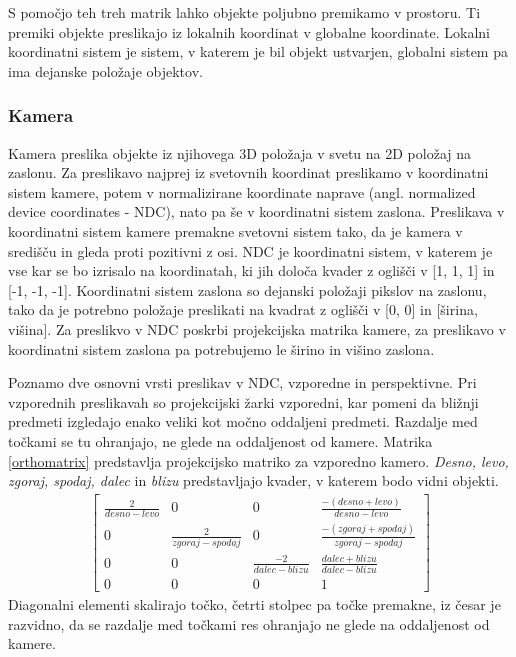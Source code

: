 \documentclass[a4paper, 12pt]{book}
\begin{document}
S pomočjo teh treh matrik lahko objekte poljubno premikamo v prostoru. Ti premiki objekte preslikajo iz lokalnih koordinat v globalne koordinate. Lokalni koordinatni sistem je sistem, v katerem je bil objekt ustvarjen, globalni sistem pa ima dejanske položaje objektov.

\subsubsection*{Kamera}

Kamera preslika objekte iz njihovega 3D položaja v svetu na 2D položaj na zaslonu. Za preslikavo najprej iz svetovnih koordinat preslikamo v koordinatni sistem kamere, potem v normalizirane koordinate naprave (angl. normalized device coordinates - NDC), nato pa še v koordinatni sistem zaslona. Preslikava v koordinatni sistem kamere premakne svetovni sistem tako, da je kamera v središču in gleda proti pozitivni z osi. NDC je koordinatni sistem, v katerem je vse kar se bo izrisalo na koordinatah, ki jih določa kvader z oglišči v [1, 1, 1] in [-1, -1, -1]. Koordinatni sistem zaslona so dejanski položaji pikslov na zaslonu, tako da je potrebno položaje preslikati na kvadrat z oglišči v [0, 0] in [širina, višina]. Za preslikvo v NDC poskrbi projekcijska matrika kamere, za preslikavo v koordinatni sistem zaslona pa potrebujemo le širino in višino zaslona.

Poznamo dve osnovni vrsti preslikav v NDC, vzporedne in perspektivne. Pri vzporednih preslikavah so projekcijski žarki vzporedni, kar pomeni da bližnji predmeti izgledajo enako veliki kot močno oddaljeni predmeti. Razdalje med točkami se tu ohranjajo, ne glede na oddaljenost od kamere. Matrika \ref{orthomatrix} predstavlja projekcijsko matriko za vzporedno kamero. \emph{Desno, levo, zgoraj, spodaj, dalec} in \emph{blizu} predstavljajo kvader, v katerem bodo vidni objekti.
\begin{align}
\begin{bmatrix}
\frac{2}{desno-levo} & 0 & 0 & \frac{-(desno+levo)}{desno-levo}\\ 
0 & \frac{2}{zgoraj-spodaj} & 0 & \frac{-(zgoraj+spodaj)}{zgoraj-spodaj} \\ 
0 & 0 & \frac{-2}{dalec-blizu} & \frac{dalec+blizu}{dalec-blizu} \\ 
0 & 0 & 0 & 1
\end{bmatrix}
\label{orthomatrix}
\end{align}
Diagonalni elementi skalirajo točko, četrti stolpec pa točke premakne, iz česar je razvidno, da se razdalje med točkami res ohranjajo ne glede na oddaljenost od kamere.
\end{document}
